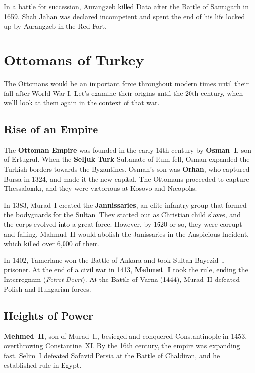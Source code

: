 In a battle for succession, Aurangzeb killed Data after the Battle of Samugarh in 1659.
Shah Jahan was declared incompetent and spent the end of his life locked up by Aurangzeb in the Red Fort.

\section{Ottomans of Turkey}

The Ottomans would be an important force throughout modern times until their fall after World War I\@.
Let's examine their origins until the 20th century, when we'll look at them again in the context of that war.

\subsection*{Rise of an Empire}

The \textbf{Ottoman Empire} was founded in the early 14th century by \textbf{Osman~I}, son of Ertugrul.
When the \textbf{Seljuk Turk} Sultanate of Rum fell, Osman expanded the Turkish borders towards the Byzantines.
Osman's son was \textbf{Orhan}, who captured Bursa in 1324, and made it the new capital.
The Ottomans proceeded to capture Thessaloniki, and they were victorious at Kosovo and Nicopolis.

In 1383, Murad~I created the \textbf{Jannissaries}, an elite infantry group that formed the bodyguards for the Sultan.
They started out as Christian child slaves, and the corps evolved into a great force.
However, by 1620 or so, they were corrupt and failing.
Mahmud~II would abolish the Janissaries in the Auspicious Incident, which killed over 6,000 of them.

In 1402, Tamerlane won the Battle of Ankara and took Sultan Bayezid~I prisoner.
At the end of a civil war in 1413, \textbf{Mehmet~I} took the rule, ending the Interregnum (\textit{Fetret Devri}).
At the Battle of Varna (1444), Murad~II defeated Polish and Hungarian forces.

\subsection*{Heights of Power}

\textbf{Mehmed~II}, son of Murad~II, besieged and conquered Constantinople in 1453, overthrowing Constantine~XI\@.
By the 16th century, the empire was expanding fast.
Selim~I defeated Safavid Persia at the Battle of Chaldiran, and he established rule in Egypt.

